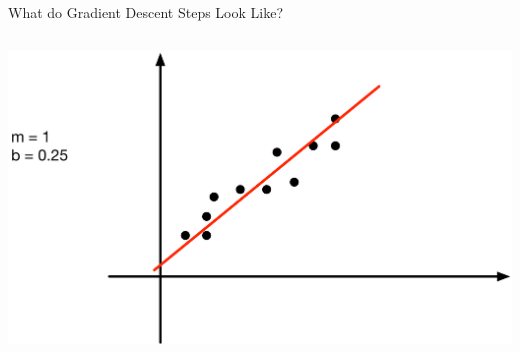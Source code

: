 \documentclass[aspectratio=169]{beamer}
\begin{document}
\begin{frame}[fragile]{What do Gradient Descent Steps Look Like?}
\begin{columns}[c]
\begin{column}{0.3\textwidth}
\includegraphics[width=1\textwidth]{lectGD/step4.pdf}
\end{column}
\end{columns}

\end{frame}
\end{document}
